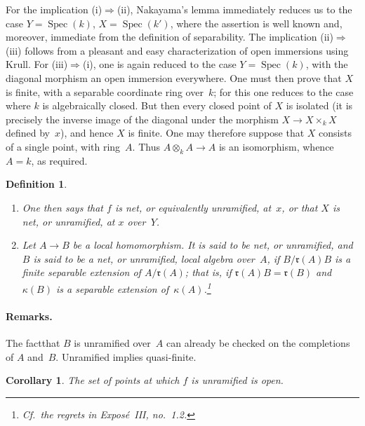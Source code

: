 \documentclass[11pt,oneside]{amsbook}
\newtheorem{corollary}[proposition]{Corollary}
\newtheorem{definition}[proposition]{Definition}
\theoremstyle{remark}
\theoremstyle{plain}
\numberwithin{equation}{section}
\begin{document}
For the implication \textup{(i)}\(\Rightarrow\)\textup{(ii)}, Nakayama's
lemma immediately reduces us to the case
\(Y=\operatorname{Spec}(k)\), \(X=\operatorname{Spec}(k')\), where the
assertion is well known and, moreover, immediate from the definition of
separability.  The implication \textup{(ii)}\(\Rightarrow\)\textup{(iii)}
follows from a pleasant and easy characterization of open immersions using
Krull.  For \textup{(iii)}\(\Rightarrow\)\textup{(i)}, one is
again reduced to the case \(Y=\operatorname{Spec}(k)\), with the diagonal
morphism an open immersion everywhere.  One must then prove that \(X\) is
finite, with a separable coordinate ring over~\(k\); for this one reduces to
the case where \(k\) is algebraically closed.  But then every closed point of
\(X\) is isolated (it is precisely the inverse image of the diagonal under
the morphism \(X\to X\times_k X\) defined by~\(x\)), and hence \(X\) is
finite.  One may therefore suppose that \(X\) consists of a single point,
with ring~\(A\).  Thus \(A\otimes_kA\to A\) is an isomorphism, whence
\(A=k\), as required.

\begin{definition}
\label{I.3.2}
\begin{enumerate}
\item[(a)] One then says that \(f\) is \emph{net}, or equivalently
  \emph{unramified}, at~\(x\), or that \(X\) is net, or unramified, at
  \(x\) over~\(Y\).
\item[(b)] Let \(A\to B\) be a local homomorphism.  It is said to be
  \emph{net}, or \emph{unramified}, and \(B\) is said to be a net, or
  unramified, local algebra over~\(A\), if
  \(B/\mathfrak r(A)B\) is a finite separable extension of
  \(A/\mathfrak r(A)\); that is, if
  \(\mathfrak r(A)B=\mathfrak r(B)\) and \(\kappa(B)\) is a separable
  extension of~\(\kappa(A)\).\footnote{Cf.\ the regrets in
  Expos\'e~III, no.~1.2.}
\end{enumerate}
\end{definition}

\paragraph{Remarks.}
The factthat
\(B\) is unramified over~\(A\) can already be checked on the completions of
\(A\) and~\(B\).  Unramified implies quasi-finite.

\begin{corollary}
\label{I.3.3}
The set of points at which \(f\) is unramified is open.
\end{corollary}
\end{document}
